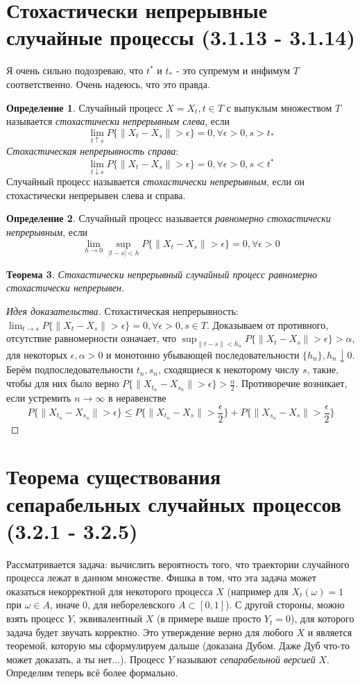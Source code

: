 \documentclass[16pt]{article}
\newtheorem{theorem}{Теорема}[section]
\theoremstyle{definition}
\newtheorem{definition}[theorem]{Определение}
\begin{document}
\section{Стохастически непрерывные случайные процессы (3.1.13 - 3.1.14)}
Я очень сильно подозреваю, что $t^*$ и $t_*$ - это супремум и инфимум $T$ соответственно. Очень надеюсь, что это правда.
\begin{definition}
Случайный процесс $X = {X_t, t \in T}$ с выпуклым множеством $T$ называется \textit{стохастически непрерывным слева}, если $$\lim_{t \uparrow s}P\{\|X_t - X_s\| > \epsilon\} = 0, \forall \epsilon > 0, s > t_*$$
\textit{Стохастическая непрерывность справа}: $$\lim_{t \downarrow s}P\{\|X_t - X_s\| > \epsilon\} = 0, \forall \epsilon > 0, s < t^*$$
Случайный процесс называется \textit{стохастически непрерывным}, если он стохастически непрерывен слева и справа.
\end{definition}
\begin{definition}
Случайный процесс называется \textit{равномерно стохастически непрерывным}, если $$\lim_{h \rightarrow 0}\sup_{|t - s| < h}P\{\|X_t - X_s\| > \epsilon\} = 0, \forall \epsilon > 0$$
\end{definition}
\begin{theorem}
Стохастически непрерывный случайный процесс равномерно стохастически непрерывен.
\end{theorem}
\begin{proof}[Идея доказательства]
Стохастическая непрерывность: $\lim_{t \rightarrow s}P\{\|X_t - X_s\| > \epsilon\} = 0, \forall \epsilon > 0, s \in T$.
Доказываем от противного, отсутствие равномерности означает, что $\sup_{\|t - s\| < h_n}P\{\|X_t - X_s\| > \epsilon\} > \alpha$, для некоторых $\epsilon, \alpha > 0$ и монотонно убывающей последовательности $\{h_n\}, h_n \downarrow 0$. Берём подпоследовательности $t_n, s_n$, сходящиеся к некоторому числу $s$, такие, чтобы для них было верно $P\{\|X_{t_n} - X_{s_n}\| > \epsilon\} > \frac{\alpha}{2}$. Противоречие возникает, если устремить $n \rightarrow \infty$ в неравенстве $$P\{\|X_{t_n} - X_{s_n}\| > \epsilon\} \le P\{\|X_{t_n} - X_{s}\| > \frac{\epsilon}{2}\} + P\{\|X_{s_n} - X_{s}\| > \frac{\epsilon}{2}\}$$
\end{proof}

\section{Теорема существования сепарабельных случайных процессов (3.2.1 - 3.2.5)}
Рассматривается задача: вычислить вероятность того, что траектории случайного процесса лежат в данном множестве. Фишка в том, что эта задача может оказаться некорректной для некоторого процесса $X$ (например для $X_t(\omega) = 1$ при $\omega \in A$, иначе $0$, для неборелевского $A \subset [0, 1]$). С другой стороны, можно взять процесс $Y$, эквивалентный $X$ (в примере выше просто $Y_t = 0$), для которого задача будет звучать корректно. Это утверждение верно для любого $X$ и является теоремой, которую мы сформулируем дальше (доказана Дубом. Даже Дуб что-то может доказать, а ты нет...). Процесс $Y$ называют \textit{сепарабельной версией} $X$. Определим теперь всё более формально.
\end{document}
